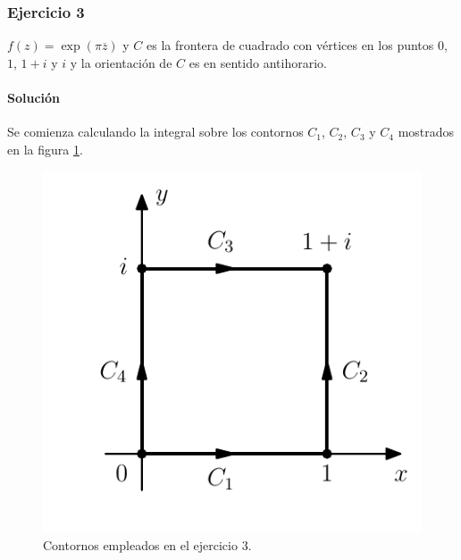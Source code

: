 \documentclass[a4paper]{report}
\begin{document}
\subsubsection{Ejercicio 3}

\(f(z)=\exp(\pi\overline{z})\) y \(C\) es la frontera de cuadrado con vértices en los puntos \(0\), \(1\), \(1+i\) y \(i\) y la orientación de \(C\) es en sentido antihorario.

\paragraph{Solución} Se comienza calculando la integral sobre los contornos \(C_1\), \(C_2\), \(C_3\) y \(C_4\) mostrados en la figura \ref{fig:exercise_46_03}.
 \begin{figure}[!htb]
  \begin{minipage}[c]{0.32\textwidth}
    \includegraphics[width=\textwidth]{figuras/exercise_46_03.pdf}
  \end{minipage}\hfill
  \begin{minipage}[c]{0.58\textwidth}
    \caption{
       Contornos empleados en el ejercicio 3.
    }\label{fig:exercise_46_03}
  \end{minipage}
 \end{figure}
\end{document}

